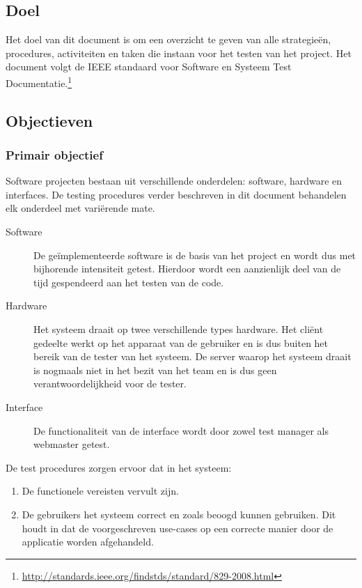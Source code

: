 \documentclass[a4paper]{article}
\begin{document}
\subsection{Doel}
Het doel van dit document is om een overzicht te geven van alle strategieën, procedures, activiteiten en taken die instaan voor het testen van het project. Het document volgt de IEEE standaard voor Software en Systeem Test Documentatie.\footnote{\url{http://standards.ieee.org/findstds/standard/829-2008.html}}

\subsection{Objectieven}

\subsubsection{Primair objectief}

Software projecten bestaan uit verschillende onderdelen: software, hardware en interfaces. De testing procedures verder beschreven in dit document behandelen elk onderdeel met variërende mate.

\begin{description}
\item[Software] De geïmplementeerde software is de basis van het project en wordt dus met bijhorende intensiteit getest. Hierdoor wordt een aanzienlijk deel van de tijd gespendeerd aan het testen van de code.

\item[Hardware] Het systeem draait op twee verschillende types hardware. Het cliënt gedeelte werkt op het apparaat van de gebruiker en is dus buiten het bereik van de tester van het systeem. De server waarop het systeem draait is nogmaals niet in het bezit van het team en is dus geen verantwoordelijkheid voor de tester.

\item[Interface] De functionaliteit van de interface wordt door zowel test manager als webmaster getest.

\end{description}

De test procedures zorgen ervoor dat in het systeem:

\begin{enumerate}
\item De functionele vereisten vervult zijn.
\item De gebruikers het systeem correct en zoals beoogd kunnen gebruiken.
Dit houdt in dat de voorgeschreven use-cases op een correcte manier door de applicatie worden afgehandeld.

\end{enumerate}
\end{document}
